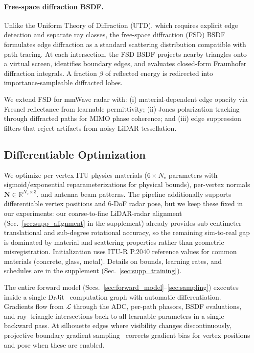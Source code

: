 \paragraph{Free-space diffraction BSDF.}
\label{sec:fsd}
Unlike the Uniform Theory of Diffraction (UTD), which requires explicit edge detection and separate ray classes, the free-space diffraction (FSD) BSDF~\cite{steinberg2024fsd} formulates edge diffraction as a standard scattering distribution compatible with path tracing. At each intersection, the FSD BSDF projects nearby triangles onto a virtual screen, identifies boundary edges, and evaluates closed-form Fraunhofer diffraction integrals. A fraction $\beta$ of reflected energy is redirected into importance-sampleable diffracted lobes.

We extend FSD for mmWave radar with: (i) material-dependent edge opacity via Fresnel reflectance from learnable permittivity; (ii) Jones polarization tracking through diffracted paths for MIMO phase coherence; and (iii) edge suppression filters that reject artifacts from noisy LiDAR tessellation.

\subsection{Differentiable Optimization}
\label{sec:optimization}

We optimize per-vertex ITU physics materials ($6 \times N_v$ parameters with sigmoid/exponential reparameterizations for physical bounds), per-vertex normals $\mathbf{N} \in \mathbb{R}^{N_v \times 3}$, and antenna beam patterns. The pipeline additionally supports differentiable vertex positions and 6-DoF radar pose, but we keep these fixed in our experiments: our coarse-to-fine LiDAR-radar alignment (Sec.~\ref{sec:supp_alignment} in the supplement) already provides sub-centimeter translational and sub-degree rotational accuracy, so the remaining sim-to-real gap is dominated by material and scattering properties rather than geometric misregistration. Initialization uses ITU-R P.2040 reference values for common materials (concrete, glass, metal). Details on bounds, learning rates, and schedules are in the supplement (Sec.~\ref{sec:supp_training}).

The entire forward model (Secs.~\ref{sec:forward_model}--\ref{sec:sampling}) executes inside a single DrJit~\cite{jakob2022dr} computation graph with automatic differentiation. Gradients flow from $\mathcal{L}$ through the ADC, per-path phasors, BSDF evaluations, and ray--triangle intersections back to all learnable parameters in a single backward pass. At silhouette edges where visibility changes discontinuously, projective boundary gradient sampling~\cite{zhang2023projective} corrects gradient bias for vertex positions and pose when these are enabled.


